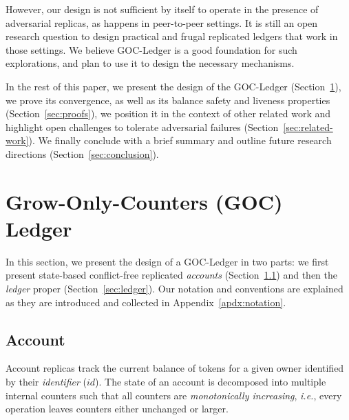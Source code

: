 \documentclass[9pt, oneside]{article}   	%
\begin{document}
However, our design is not sufficient by itself to operate in the presence of adversarial replicas, as happens in peer-to-peer settings. It is still an open research question to design practical and frugal replicated ledgers that work in those settings. We believe GOC-Ledger is a good foundation for such explorations, and plan to use it to design the necessary mechanisms. 

In the rest of this paper,  we present the design of the GOC-Ledger (Section~\ref{sec:design}), we prove its convergence, as well as its balance safety and liveness properties (Section~\ref{sec:proofs}), we position it in the context of other related work  and highlight open challenges to tolerate adversarial failures (Section~\ref{sec:related-work}). We finally conclude with a brief summary and outline future research directions (Section~\ref{sec:conclusion}).

\newpage

\section{Grow-Only-Counters (GOC) Ledger}
\label{sec:design}

In this section, we present the design of a GOC-Ledger in two parts: we first present state-based conflict-free replicated \textit{accounts} (Section~\ref{sec:account}) and then the \textit{ledger} proper (Section~\ref{sec:ledger}). Our notation and conventions are explained as they are introduced and collected in Appendix~\ref{apdx:notation}.

\subsection{Account}
\label{sec:account}

Account replicas track the current balance of tokens for a given owner identified by their \textit{identifier} ($id$). The state of an account is decomposed into multiple internal counters such that all counters are \textit{monotonically increasing}, \textit{i.e.}, every operation leaves counters either unchanged or larger. 
\end{document}
